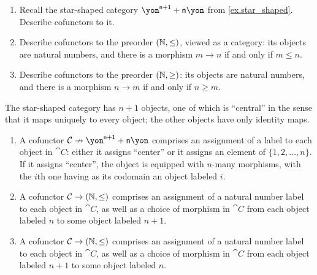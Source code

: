 \documentclass[Book-Poly]{subfiles}
\begin{document}
\begin{exercise}
\begin{enumerate}
	\item Recall the star-shaped category ${\yon}^{\ord{n}+\1}+\ord{n}\yon$ from \cref{ex.star_shaped}. Describe cofunctors to it.
	\item Describe cofunctors to the preorder $(\mathbb{N},\leq)$, viewed as a category: its objects are natural numbers, and there is a morphism $m\to n$ if and only if $m\leq n$.
	\item Describe cofunctors to the preorder $(\mathbb{N},\geq)$: its objects are natural numbers, and there is a morphism $n\to m$ if and only if $n\geq m$.
\qedhere
\end{enumerate}
\begin{solution}
The star-shaped category has $n+1$ objects, one of which is ``central'' in the sense that it maps uniquely to every object; the other objects have only identity maps.
\begin{enumerate}
    \item A cofunctor $\cat{C}\cof\yon^{\ord{n}+\1}+\ord{n}\yon$ comprises an assignment of a label to each object in $\cat{C}$: either it assigns ``center'' or it assigns an element of $\{1,2,\ldots,n\}$. If it assigns ``center'', the object is equipped with $n$-many morphisms, with the $i$th one having as its codomain an object labeled $i$. 
    \item A cofunctor $\mathcal{C}\to(\mathbb{N},\leq)$ comprises an assignment of a natural number label to each object in $\cat{C}$, as well as a choice of morphism in $\cat{C}$ from each object labeled $n$ to some object labeled $n+1$.
    \item A cofunctor $\mathcal{C}\to(\mathbb{N},\leq)$ comprises an assignment of a natural number label to each object in $\cat{C}$, as well as a choice of morphism in $\cat{C}$ from each object labeled $n+1$ to some object labeled $n$.
\end{enumerate}
\end{solution}
\end{exercise}
\end{document}
